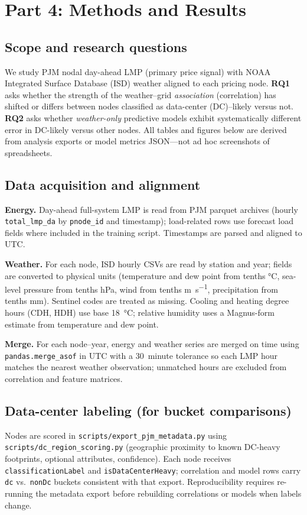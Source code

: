 \documentclass[11pt]{article}
\begin{document}
\singlespacing

\section*{Part 4: Methods and Results}

\subsection*{Scope and research questions}
We study PJM nodal day-ahead LMP (primary price signal) with NOAA Integrated Surface Database (ISD) weather aligned to each pricing node. \textbf{RQ1} asks whether the strength of the weather--grid \emph{association} (correlation) has shifted or differs between nodes classified as data-center (DC)--likely versus not. \textbf{RQ2} asks whether \emph{weather-only} predictive models exhibit systematically different error in DC-likely versus other nodes. All tables and figures below are derived from analysis exports or model metrics JSON---not ad hoc screenshots of spreadsheets.

\subsection*{Data acquisition and alignment}
\textbf{Energy.} Day-ahead full-system LMP is read from PJM parquet archives (hourly \texttt{total\_lmp\_da} by \texttt{pnode\_id} and timestamp); load-related rows use forecast load fields where included in the training script. Timestamps are parsed and aligned to UTC.

\textbf{Weather.} For each node, ISD hourly CSVs are read by station and year; fields are converted to physical units (temperature and dew point from tenths \si{\celsius}, sea-level pressure from tenths hPa, wind from tenths \si{\meter\per\second}, precipitation from tenths mm). Sentinel codes are treated as missing. Cooling and heating degree hours (CDH, HDH) use base \SI{18}{\celsius}; relative humidity uses a Magnus-form estimate from temperature and dew point.

\textbf{Merge.} For each node--year, energy and weather series are merged on time using \texttt{pandas.merge\_asof} in UTC with a \SI{30}{minute} tolerance so each LMP hour matches the nearest weather observation; unmatched hours are excluded from correlation and feature matrices.

\subsection*{Data-center labeling (for bucket comparisons)}
Nodes are scored in \texttt{scripts/export\_pjm\_metadata.py} using \texttt{scripts/dc\_region\_scoring.py} (geographic proximity to known DC-heavy footprints, optional attributes, confidence). Each node receives \texttt{classificationLabel} and \texttt{isDataCenterHeavy}; correlation and model rows carry \texttt{dc} vs.\ \texttt{nonDc} buckets consistent with that export. Reproducibility requires re-running the metadata export before rebuilding correlations or models when labels change.
\end{document}
